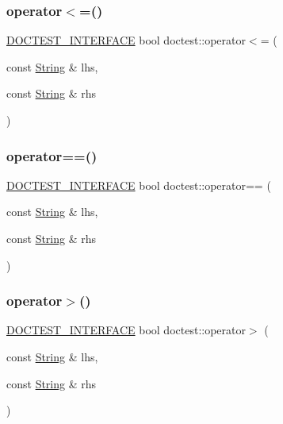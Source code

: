 \mbox{\label{namespacedoctest_a27c6c308e814ad9384499bafc03f9e39}} 
\subsubsection{\texorpdfstring{operator$<$=()}{operator<=()}}
{\footnotesize\ttfamily \hyperlink{doctest_8h_a9c16ffc635ec47f07797d21ede26b1a5}{D\+O\+C\+T\+E\+S\+T\+\_\+\+I\+N\+T\+E\+R\+F\+A\+CE} bool doctest\+::operator$<$= (\begin{DoxyParamCaption}\item[{const \hyperlink{classdoctest_1_1_string}{String} \&}]{lhs,  }\item[{const \hyperlink{classdoctest_1_1_string}{String} \&}]{rhs }\end{DoxyParamCaption})}

\mbox{\label{namespacedoctest_ae332e5e775f83a532884303780f79f9f}} 
\subsubsection{\texorpdfstring{operator==()}{operator==()}}
{\footnotesize\ttfamily \hyperlink{doctest_8h_a9c16ffc635ec47f07797d21ede26b1a5}{D\+O\+C\+T\+E\+S\+T\+\_\+\+I\+N\+T\+E\+R\+F\+A\+CE} bool doctest\+::operator== (\begin{DoxyParamCaption}\item[{const \hyperlink{classdoctest_1_1_string}{String} \&}]{lhs,  }\item[{const \hyperlink{classdoctest_1_1_string}{String} \&}]{rhs }\end{DoxyParamCaption})}

\mbox{\label{namespacedoctest_acef5990b03a973c74ff2dd6cfc112913}} 
\subsubsection{\texorpdfstring{operator$>$()}{operator>()}}
{\footnotesize\ttfamily \hyperlink{doctest_8h_a9c16ffc635ec47f07797d21ede26b1a5}{D\+O\+C\+T\+E\+S\+T\+\_\+\+I\+N\+T\+E\+R\+F\+A\+CE} bool doctest\+::operator$>$ (\begin{DoxyParamCaption}\item[{const \hyperlink{classdoctest_1_1_string}{String} \&}]{lhs,  }\item[{const \hyperlink{classdoctest_1_1_string}{String} \&}]{rhs }\end{DoxyParamCaption})}

